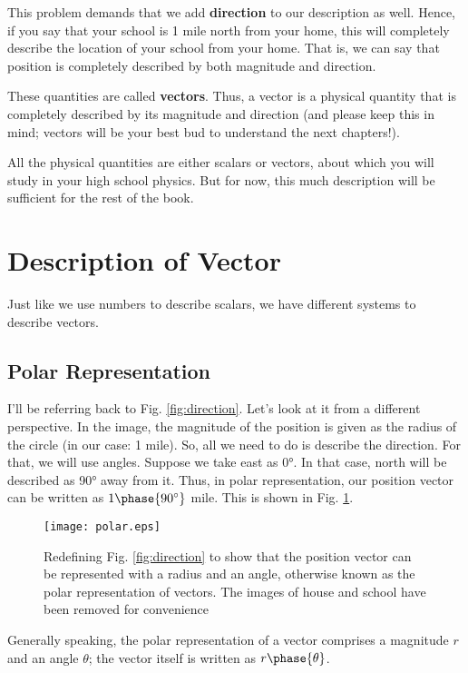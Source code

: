 This problem demands that we add \textbf{direction} to our description as well. Hence, if you say that your school is 1 mile north from your home, this will completely describe the location of your school from your home. That is, we can say that position is completely described by both magnitude and direction. 

These quantities are called \textbf{vectors}. Thus, a vector is a physical quantity that is completely described by its magnitude and direction (and please keep this in mind; vectors will be your best bud to understand the next chapters!).

All the physical quantities are either scalars or vectors, about which you will study in your high school physics. But for now, this much description will be sufficient for the rest of the book.

\section{Description of Vector}
Just like we use numbers to describe scalars, we have different systems to describe vectors. 
\subsection{Polar Representation}
I'll be referring back to Fig. \ref{fig:direction}. Let's look at it from a different perspective. In the image, the magnitude of the position is given as the radius of the circle (in our case: 1 mile). So, all we need to do is describe the direction. For that, we will use angles. Suppose we take east as 0\si{\degree}. In that case, north will be described as 90\si{\degree} away from it. Thus, in polar representation, our position vector can be written as $1\phase{90\si{\degree}}$ mile. This is shown in Fig. \ref{fig:polar}.

\begin{figure}[!ht]
    \centering
    \texttt{[image: polar.eps]}
    \caption{Redefining Fig. \ref{fig:direction} to show that the position vector can be represented with a radius and an angle, otherwise known as the polar representation of vectors. The images of house and school have been removed for convenience}
    \label{fig:polar}
\end{figure}

Generally speaking, the polar representation of a vector comprises a magnitude $r$ and an angle $\theta$; the vector itself is written as $r\phase{\theta}$.

